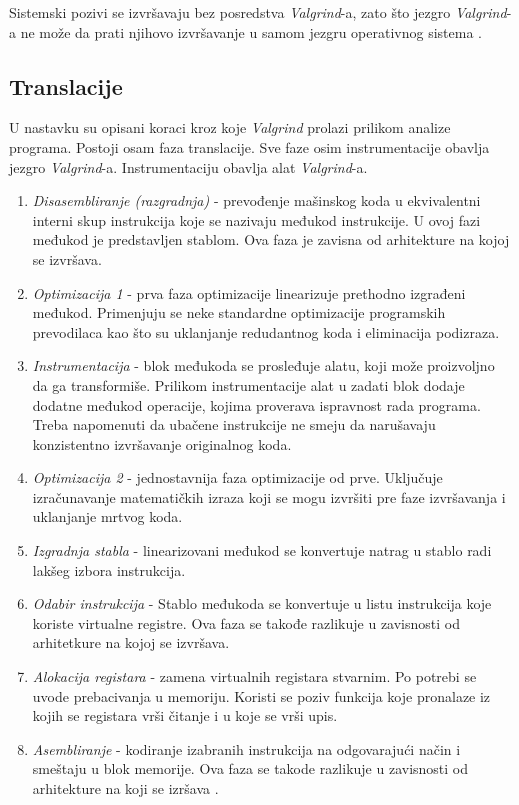 \documentclass[12pt,oneside]{memoir}
\theoremstyle{plain}
\theoremstyle{definition}
\begin{document}
Sistemski pozivi se izvršavaju bez posredstva \textit{Valgrind}-a, zato što jezgro \textit{Valgrind}-a ne može da prati njihovo izvršavanje u samom jezgru operativnog sistema \cite{os}. 

\subsection*{Translacije}
U nastavku su opisani koraci kroz koje \textit{Valgrind} prolazi prilikom analize programa. Postoji osam faza translacije. Sve faze osim instrumentacije obavlja jezgro \textit{Valgrind}-a. Instrumentaciju obavlja alat \textit{Valgrind}-a.
\begin{enumerate}
\item \textit{Disasembliranje (razgradnja)} - prevođenje mašinskog koda u ekvivalentni interni skup instrukcija koje se nazivaju međukod instrukcije. U ovoj fazi međukod je predstavljen stablom. Ova faza je zavisna od arhitekture na kojoj se izvršava. 
\item \textit{Optimizacija 1} - prva faza optimizacije linearizuje prethodno izgrađeni međukod. Primenjuju se neke standardne optimizacije programskih prevodilaca kao što su uklanjanje redudantnog koda i eliminacija podizraza.
\item \textit{Instrumentacija} - blok međukoda se prosleđuje alatu, koji može proizvoljno da ga transformiše. Prilikom instrumentacije alat u zadati blok dodaje dodatne međukod operacije, kojima proverava ispravnost rada programa. Treba napomenuti da ubačene instrukcije ne smeju da narušavaju konzistentno izvršavanje originalnog koda. 
\item \textit{Optimizacija 2} - jednostavnija faza optimizacije od prve. Uključuje izračunavanje matematičkih izraza koji se mogu izvršiti pre faze izvršavanja i uklanjanje mrtvog koda.
\item \textit{Izgradnja stabla} - linearizovani međukod se konvertuje natrag u stablo radi lakšeg izbora instrukcija. 
\item \textit{Odabir instrukcija} - Stablo međukoda se konvertuje u listu instrukcija koje koriste virtualne registre. Ova faza se takođe razlikuje u zavisnosti od arhitetkure na kojoj se izvršava. 
\item \textit{Alokacija registara} - zamena virtualnih registara stvarnim. Po potrebi se uvode prebacivanja u memoriju. Koristi se poziv funkcija koje pronalaze iz kojih se registara vrši čitanje i u koje se vrši upis.
\item \textit{Asembliranje} - kodiranje izabranih instrukcija na odgovarajući način i smeštaju u blok memorije. Ova faza se takode razlikuje u zavisnosti od arhitekture na koji se izršava \cite{03DinamickaAnaliza,AKMSc}. 
\end{enumerate}
\end{document}
